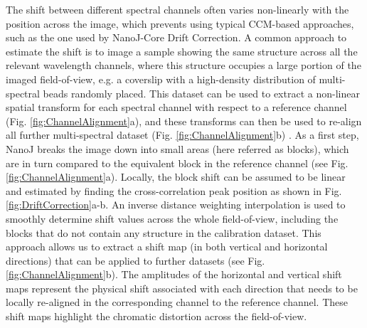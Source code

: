 The shift between different spectral channels often varies non-linearly with the position across the image, which prevents using typical CCM-based approaches, such as the one used by NanoJ-Core Drift Correction. A common approach to estimate the shift is to image a sample showing the same structure across all the relevant wavelength channels, where this structure occupies a large portion of the imaged field-of-view, e.g. a coverslip with a high-density distribution of multi-spectral beads randomly placed. This dataset can be used to extract a non-linear spatial transform for each spectral channel with respect to a reference channel (Fig. \ref{fig:ChannelAlignment}a), and these transforms can then be used to re-align all further multi-spectral dataset (Fig. \ref{fig:ChannelAlignment}b) \cite{arganda2006consistent,annibale2012identification}. 
 As a first step, NanoJ breaks the image down into small areas (here referred as blocks), which are in turn compared to the equivalent block in the reference channel (see Fig.\ref{fig:ChannelAlignment}a). Locally, the block shift can be assumed to be linear and estimated by finding the cross-correlation peak position as shown in Fig.\ref{fig:DriftCorrection}a-b. An inverse distance weighting interpolation \cite{shepard1968two} is used to smoothly determine shift values across the whole field-of-view, including the blocks that do not contain any structure in the calibration dataset. This approach allows us to extract a shift map (in both vertical and horizontal directions) that can be applied to further datasets (see Fig.\ref{fig:ChannelAlignment}b). The amplitudes of the horizontal and vertical shift maps represent the physical shift associated with each direction that needs to be locally re-aligned in the corresponding channel to the reference channel. These shift maps highlight the chromatic distortion across the field-of-view. 
 
